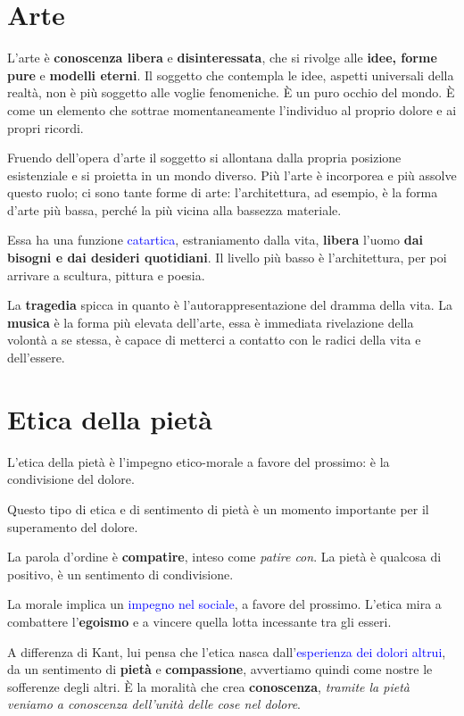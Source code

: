 \documentclass[a4paper, twoside, titlepage]{book}
\renewcommand{\emph}[1]{\textcolor{blue}{#1}}
\begin{document}
\section{Arte}

L'arte è \textbf{conoscenza libera} e \textbf{disinteressata}, che si rivolge alle \textbf{idee, forme pure} e \textbf{modelli eterni}. Il soggetto che contempla le idee, aspetti universali della realtà, non è più soggetto alle voglie fenomeniche. È un puro occhio del mondo. È come un elemento che sottrae momentaneamente l'individuo al proprio dolore e ai propri ricordi.

Fruendo dell'opera d'arte il soggetto si allontana dalla propria posizione esistenziale e si proietta in un mondo diverso. Più l'arte è incorporea e più assolve questo ruolo; ci sono tante forme di arte: l'architettura, ad esempio, è la forma d'arte più bassa, perché la più vicina alla bassezza materiale.

Essa ha una funzione \emph{catartica}, estraniamento dalla vita, \textbf{libera} l’uomo \textbf{dai bisogni e dai desideri quotidiani}. Il livello più basso è l’architettura, per poi arrivare a scultura, pittura e poesia.

La \textbf{tragedia} spicca in quanto è l’autorappresentazione del dramma della vita. La \textbf{musica} è la forma più elevata dell’arte, essa è immediata rivelazione della volontà a se stessa, è capace di metterci a contatto con le radici della vita e dell’essere.

\section{Etica della pietà}

L'etica della pietà è l'impegno etico-morale a favore del prossimo: è la condivisione del dolore.

Questo tipo di etica e di sentimento di pietà è un momento importante per il superamento del dolore.

La parola d'ordine è \textbf{compatire}, inteso come \textit{patire con}.
La pietà è qualcosa di positivo, è un sentimento di condivisione.

La morale implica un \emph{impegno nel sociale}, a favore del prossimo. L’etica mira a combattere l’\textbf{egoismo} e a vincere quella lotta incessante tra gli esseri.

A differenza di Kant, lui pensa che l’etica nasca dall’\emph{esperienza dei dolori altrui}, da un sentimento di \textbf{pietà} e \textbf{compassione}, avvertiamo quindi come nostre le sofferenze degli altri. È la moralità che crea \textbf{conoscenza}, \textit{tramite la pietà veniamo a conoscenza dell’unità delle cose nel dolore}.
\end{document}
